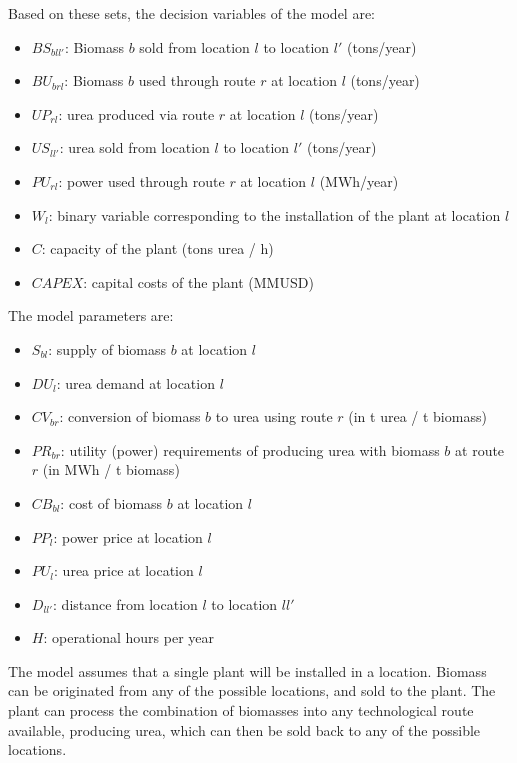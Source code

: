 \documentclass[a4paper, titlepage]{article}
\begin{document}
Based on these sets, the decision variables of the model are:

\begin{itemize}
    \item $BS_{bll'}$: Biomass $b$ sold from location $l$ to location $l'$ (tons/year)
    \item $BU_{brl}$: Biomass $b$ used through route $r$ at location $l$ (tons/year)
    \item $UP_{rl}$: urea produced via route $r$ at location $l$ (tons/year)
    \item $US_{ll'}$: urea sold from location $l$ to location $l'$ (tons/year)
    \item $PU_{rl}$: power used through route $r$ at location $l$ (MWh/year)
    \item $W_l$: binary variable corresponding to the installation of the plant at location $l$
    \item $C$: capacity of the plant (tons urea / h)
    \item $CAPEX$: capital costs of the plant (MMUSD)
\end{itemize}

The model parameters are:
\begin{itemize}
    \item $S_{bl}$: supply of biomass $b$ at location $l$
    \item $DU_l$: urea demand at location $l$
    \item $CV_{br}$: conversion of biomass $b$ to urea using route $r$ (in t urea / t biomass)
    \item $PR_{br}$: utility (power) requirements of producing urea with biomass $b$ at route $r$ (in MWh / t biomass)
    \item $CB_{bl}$: cost of biomass $b$ at location $l$
    \item $PP_l$: power price at location $l$
    \item $PU_l$: urea price at location $l$
    \item $D_{ll'}$: distance from location $l$ to location $ll'$
    \item $H$: operational hours per year

\end{itemize}

The model assumes that a single plant will be installed in a location. Biomass can be originated from any of the
possible locations, and sold to the plant. The plant can process the combination of biomasses into any technological
route available, producing urea, which can then be sold back to any of the possible locations.
\end{document}
